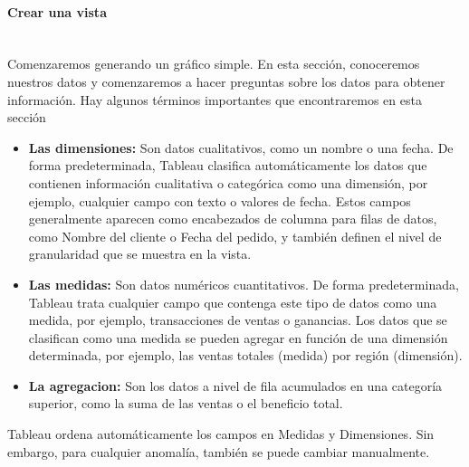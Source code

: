 \documentclass[12pt,letterpaper]{article}
\begin{document}
    \paragraph{\large Crear una vista\\ \\}
    Comenzaremos generando un gráfico simple. En esta sección, conoceremos nuestros datos y comenzaremos a hacer preguntas sobre los datos para obtener información. Hay algunos términos importantes que encontraremos en esta sección
    \begin{itemize}
        \item \textbf{Las dimensiones:} Son datos cualitativos, como un nombre o una fecha. De forma predeterminada, Tableau clasifica automáticamente los datos que contienen información cualitativa o categórica como una dimensión, por ejemplo, cualquier campo con texto o valores de fecha. Estos campos generalmente aparecen como encabezados de columna para filas de datos, como Nombre del cliente o Fecha del pedido, y también definen el nivel de granularidad que se muestra en la vista.
        \item \textbf{Las medidas:} Son datos numéricos cuantitativos. De forma predeterminada, Tableau trata cualquier campo que contenga este tipo de datos como una medida, por ejemplo, transacciones de ventas o ganancias. Los datos que se clasifican como una medida se pueden agregar en función de una dimensión determinada, por ejemplo, las ventas totales (medida) por región (dimensión).
        \item \textbf{La agregacion:} Son los datos a nivel de fila acumulados en una categoría superior, como la suma de las ventas o el beneficio total.
    \end{itemize}
    Tableau ordena automáticamente los campos en Medidas y Dimensiones. Sin embargo, para cualquier anomalía, también se puede cambiar manualmente.
\end{document}
